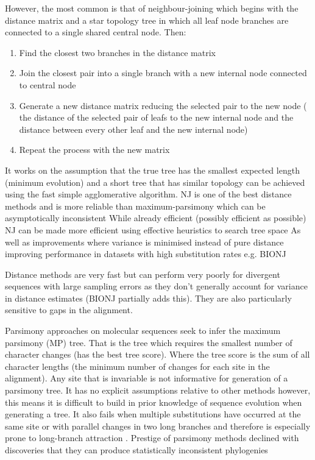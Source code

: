 However, the most common is that of neighbour-joining which begins with the distance matrix and a 
star topology tree in which all leaf node branches are connected to a single shared central node.
Then:
\begin{enumerate}
    \item Find the closest two branches in the distance matrix 
    \item Join the closest pair into a single branch with a new internal node connected to central node
    \item Generate a new distance matrix reducing the selected pair to the new node (     
        the distance of the selected pair of leafs to the new internal node 
    and the distance between every other leaf and the new internal node)
    \item Repeat the process with the new matrix \citep{Nei1987}
\end{enumerate}

It works on the assumption that the true tree has the smallest expected length (minimum evolution) and a short tree that has similar topology can be achieved using the 
fast simple agglomerative algorithm.  NJ is one of the best distance methods and 
is more reliable than maximum-parsimony which can be asymptotically inconsistent
While already efficient (possibly efficient as possible) NJ can be made more efficient 
using effective heuristics to search tree space \citep{Kumar1996}
As well as improvements where variance is minimised instead of pure distance improving performance in datasets with high
substitution rates e.g. BIONJ \citep{Gascuel1997}

Distance methods are very fast but can perform
very poorly for divergent sequences with large sampling errors as they don't generally account for variance in 
distance estimates \citep{Yang2012} (BIONJ partially adds this).  They are also
particularly sensitive to gaps in the alignment.



Parsimony approaches \citep{Camin1965} on molecular sequences \citep{Eck1966} seek to infer the maximum parsimony (MP) tree.
That is the tree which requires the smallest number of character changes (has the best tree score).  Where the tree score is the sum of 
all character lengths (the minimum number of changes for each site in the alignment).  Any site that is invariable is not
informative for generation of a parsimony tree.
It has no explicit assumptions relative to other methods however, this means it is difficult to build in 
prior knowledge of sequence evolution when generating a tree.
It also fails when multiple substitutions have occurred at the same site or with parallel changes in two long branches 
and therefore is especially prone to long-branch attraction
\citep{Felsenstein1978}.
Prestige of parsimony methods declined with discoveries that they can produce statistically inconsistent
phylogenies \citep{Felsenstein2001}

